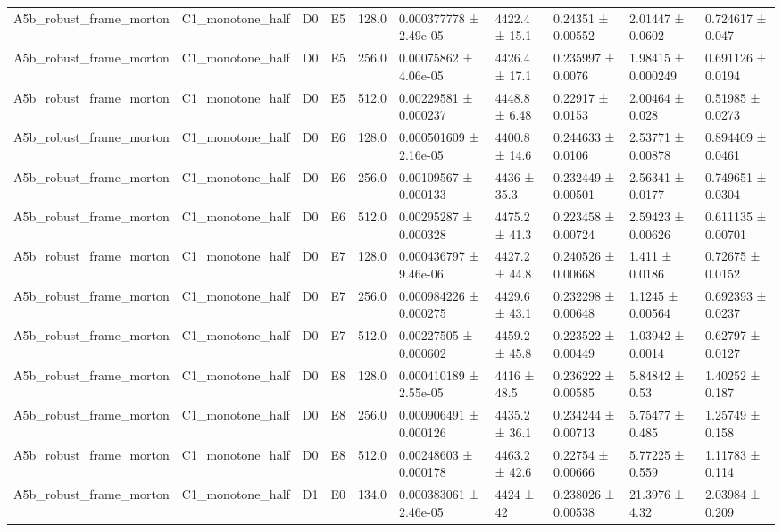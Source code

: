 \begin{table}
\begin{tabular}{llllllllll}
A5b\_robust\_frame\_morton & C1\_monotone\_half & D0 & E5 & 128.0 & 0.000377778 ± 2.49e-05 & 4422.4 ± 15.1 & 0.24351 ± 0.00552 & 2.01447 ± 0.0602 & 0.724617 ± 0.047 \\
A5b\_robust\_frame\_morton & C1\_monotone\_half & D0 & E5 & 256.0 & 0.00075862 ± 4.06e-05 & 4426.4 ± 17.1 & 0.235997 ± 0.0076 & 1.98415 ± 0.000249 & 0.691126 ± 0.0194 \\
A5b\_robust\_frame\_morton & C1\_monotone\_half & D0 & E5 & 512.0 & 0.00229581 ± 0.000237 & 4448.8 ± 6.48 & 0.22917 ± 0.0153 & 2.00464 ± 0.028 & 0.51985 ± 0.0273 \\
A5b\_robust\_frame\_morton & C1\_monotone\_half & D0 & E6 & 128.0 & 0.000501609 ± 2.16e-05 & 4400.8 ± 14.6 & 0.244633 ± 0.0106 & 2.53771 ± 0.00878 & 0.894409 ± 0.0461 \\
A5b\_robust\_frame\_morton & C1\_monotone\_half & D0 & E6 & 256.0 & 0.00109567 ± 0.000133 & 4436 ± 35.3 & 0.232449 ± 0.00501 & 2.56341 ± 0.0177 & 0.749651 ± 0.0304 \\
A5b\_robust\_frame\_morton & C1\_monotone\_half & D0 & E6 & 512.0 & 0.00295287 ± 0.000328 & 4475.2 ± 41.3 & 0.223458 ± 0.00724 & 2.59423 ± 0.00626 & 0.611135 ± 0.00701 \\
A5b\_robust\_frame\_morton & C1\_monotone\_half & D0 & E7 & 128.0 & 0.000436797 ± 9.46e-06 & 4427.2 ± 44.8 & 0.240526 ± 0.00668 & 1.411 ± 0.0186 & 0.72675 ± 0.0152 \\
A5b\_robust\_frame\_morton & C1\_monotone\_half & D0 & E7 & 256.0 & 0.000984226 ± 0.000275 & 4429.6 ± 43.1 & 0.232298 ± 0.00648 & 1.1245 ± 0.00564 & 0.692393 ± 0.0237 \\
A5b\_robust\_frame\_morton & C1\_monotone\_half & D0 & E7 & 512.0 & 0.00227505 ± 0.000602 & 4459.2 ± 45.8 & 0.223522 ± 0.00449 & 1.03942 ± 0.0014 & 0.62797 ± 0.0127 \\
A5b\_robust\_frame\_morton & C1\_monotone\_half & D0 & E8 & 128.0 & 0.000410189 ± 2.55e-05 & 4416 ± 48.5 & 0.236222 ± 0.00585 & 5.84842 ± 0.53 & 1.40252 ± 0.187 \\
A5b\_robust\_frame\_morton & C1\_monotone\_half & D0 & E8 & 256.0 & 0.000906491 ± 0.000126 & 4435.2 ± 36.1 & 0.234244 ± 0.00713 & 5.75477 ± 0.485 & 1.25749 ± 0.158 \\
A5b\_robust\_frame\_morton & C1\_monotone\_half & D0 & E8 & 512.0 & 0.00248603 ± 0.000178 & 4463.2 ± 42.6 & 0.22754 ± 0.00666 & 5.77225 ± 0.559 & 1.11783 ± 0.114 \\
A5b\_robust\_frame\_morton & C1\_monotone\_half & D1 & E0 & 134.0 & 0.000383061 ± 2.46e-05 & 4424 ± 42 & 0.238026 ± 0.00538 & 21.3976 ± 4.32 & 2.03984 ± 0.209 \\

\end{tabular}
\end{table}
